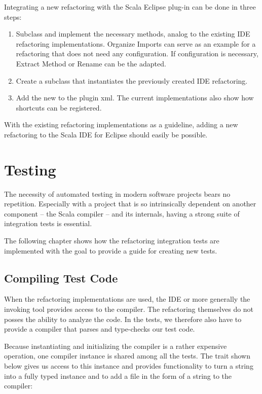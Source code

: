 \documentclass[10pt,a4paper,oneside]{scrreprt}
\begin{document}
Integrating a new refactoring with the Scala Eclipse plug-in can be done in three steps:

\begin{enumerate}
  \item Subclass  and implement the necessary methods, analog to the existing IDE refactoring implementations. Organize Imports can serve as an example for a refactoring that does not need any configuration. If configuration is necessary, Extract Method or Rename can be the adapted.
  \item Create a  subclass that instantiates the previously created IDE refactoring.
  \item Add the new  to the plugin xml. The current implementations also show how shortcuts can be registered.
\end{enumerate}

With the existing refactoring implementations as a guideline, adding a new refactoring to the Scala IDE for Eclipse should easily be possible.

\chapter{Testing} \label{chapter:testing}

The necessity of automated testing in modern software projects bears no repetition. Especially with a project that is so intrinsically dependent on another component -- the Scala compiler -- and its internals, having a strong suite of integration tests is essential. 

The following chapter shows how the refactoring integration tests are implemented with the goal to provide a guide for creating new tests.

\section{Compiling Test Code}

When the refactoring implementations are used, the IDE or more generally the invoking tool provides access to the compiler. The refactoring themselves do not posses the ability to analyze the code. In the tests, we therefore also have to provide a compiler that parses and type-checks our test code.

Because instantiating and initializing the compiler is a rather expensive operation, one compiler instance is shared among all the tests. The  trait shown below gives us access to this instance and provides functionality to turn a string into a fully typed  instance and to add a file in the form of a string to the compiler:
\end{document}
